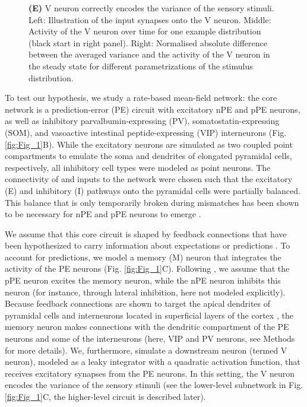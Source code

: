 \documentclass[10pt,a4paper]{article}
\begin{document}
\begin{figure}[t!]
{{\bf (E)} V neuron correctly encodes the variance of the sensory stimuli. Left: Illustration of the input synapses onto the V neuron. Middle: Activity of the V neuron over time for one example distribution (black start in right panel). Right: Normalised absolute difference between the averaged variance and the activity of the V neuron in the steady state for different parametrizations of the stimulus distribution.
}
\label{fig:Fig_2}
\end{figure}
%

To test our hypothesis, we study a rate-based mean-field network: the core network is a prediction-error (PE) circuit with excitatory nPE and pPE neurons, as well as inhibitory parvalbumin-expressing (PV), somatostatin-expressing (SOM), and vasoactive intestinal peptide-expressing (VIP) interneurons (Fig. \ref{fig:Fig_1}B). While the excitatory neurons are simulated as two coupled point compartments to emulate the soma and dendrites of elongated pyramidal cells, respectively, all inhibitory cell types were modeled as point neurons. The connectivity of and inputs to the network were chosen such that the excitatory (E) and inhibitory (I) pathways onto the pyramidal cells were partially balanced. This balance that is only temporarily broken during mismatches has been shown to be necessary for nPE and pPE neurons to emerge \citep[][see Methods]{hertag2020learning, hertag2022prediction}. 

We assume that this core circuit is shaped by feedback connections \citep{larkum2013cellular, harris2015neocortical} that have been hypothesized to carry information about expectations or predictions \citep{mumford1992computational, larkum2013cellular, friston2008hierarchical}. To account for predictions, we model a memory (M) neuron that integrates the activity of the PE neurons (Fig. \ref{fig:Fig_1}C). Following \cite{keller2018predictive}, we assume that the pPE neuron excites the memory neuron, while the nPE neuron inhibits this neuron (for instance, through lateral inhibition, here not modeled explicitly). Because feedback connections are shown to target the apical dendrites of pyramidal cells \citep{larkum2013cellular} and interneurons located in superficial layers of the cortex \citep[see, e.g.][]{tremblay2016gabaergic}, the memory neuron makes connections with the dendritic compartment of the PE neurons and some of the interneurons (here, VIP and PV neurons, see Methods for more details). We, furthermore, simulate a downstream neuron (termed V neuron), modeled as a leaky integrator with a quadratic activation function, that receives excitatory synapses from the PE neurons. In this setting, the V neuron encodes the variance of the sensory stimuli (see the lower-level subnetwork in Fig. \ref{fig:Fig_1}C, the higher-level circuit is described later). 
\end{document}
